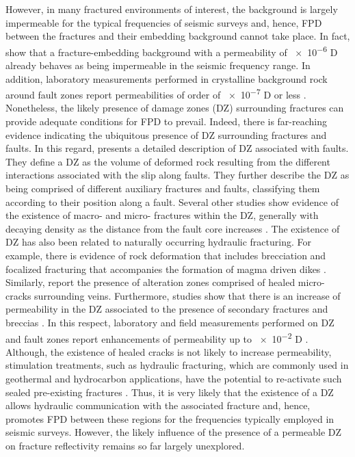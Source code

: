 \documentclass[draft]{agujournal2019}
\begin{document}
However, in many fractured environments of interest, the background is largely impermeable
for the typical frequencies of seismic surveys \cite{Rubino2014} 
and, hence, FPD  between the fractures and their embedding background cannot take place. In fact,  show that a fracture-embedding background with a permeability of  \num{e-6} D already behaves as being impermeable in the seismic frequency range. In addition,  laboratory measurements performed in crystalline background rock around fault zones report permeabilities of order of \num{e-7} D or less \cite{Wibberley2003, Mitchell2012}.
Nonetheless, the likely presence of damage zones (DZ) surrounding fractures can provide adequate conditions for FPD to prevail.
Indeed, there is far-reaching evidence indicating the ubiquitous presence of DZ surrounding fractures and faults.
In this regard,  presents a detailed description of DZ associated with faults. They define a DZ as the volume of deformed rock resulting from the different interactions associated with the slip along faults. They further describe the DZ as being comprised of different auxiliary fractures and faults, classifying them according to their position along a fault. Several other studies show evidence of the existence of macro- and micro- fractures within the DZ, generally with decaying density as the distance from the fault core increases \cite{Mitchell2009,Faulkner2011, Savage2011}.
The existence of  DZ has also been related to naturally occurring hydraulic fracturing. For example, there is evidence of rock deformation that includes brecciation and focalized fracturing that accompanies the formation of magma driven dikes \cite{Delaney1981, Brown2007}. Similarly,  report the presence of alteration zones comprised of healed micro-cracks surrounding veins.
Furthermore, studies show that there is an increase of permeability in the DZ  associated to the presence of secondary fractures  \cite{Mitchell2012} and breccias \cite{Sruoga2004, Sruoga2007}. 
In this respect, laboratory and field measurements performed on DZ and fault zones report enhancements of permeability up to \num{e-2} D \cite{Brace1984,Wibberley2003}.
Although, the existence of healed cracks is not likely to increase permeability, stimulation treatments, such as hydraulic fracturing, which are commonly used in geothermal and hydrocarbon applications, have the potential to re-activate such sealed pre-existing fractures \cite{gale2010natural, dahi2013natural}.
Thus, it is very likely that the existence of a DZ  allows hydraulic communication with the associated fracture and, hence, promotes FPD between these regions for the frequencies typically employed in seismic surveys. However, the likely influence of the presence of a permeable DZ on fracture reflectivity remains so far largely unexplored. 
\end{document}
